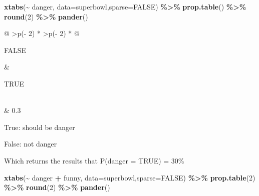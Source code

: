 \documentclass[
]{article}
\newenvironment{Shaded}{\begin{snugshade}}{\end{snugshade}}
\newcommand{\AttributeTok}[1]{\textcolor[rgb]{0.13,0.29,0.53}{#1}}
\newcommand{\ConstantTok}[1]{\textcolor[rgb]{0.56,0.35,0.01}{#1}}
\newcommand{\DecValTok}[1]{\textcolor[rgb]{0.00,0.00,0.81}{#1}}
\newcommand{\FunctionTok}[1]{\textcolor[rgb]{0.13,0.29,0.53}{\textbf{#1}}}
\newcommand{\NormalTok}[1]{#1}
\newcommand{\SpecialCharTok}[1]{\textcolor[rgb]{0.81,0.36,0.00}{\textbf{#1}}}
\begin{document}
\begin{Shaded}
\begin{Highlighting}[]
\FunctionTok{xtabs}\NormalTok{(}\SpecialCharTok{\textasciitilde{}}\NormalTok{ danger, }\AttributeTok{data=}\NormalTok{superbowl,}\AttributeTok{sparse=}\ConstantTok{FALSE}\NormalTok{) }\SpecialCharTok{\%\textgreater{}\%} \FunctionTok{prop.table}\NormalTok{() }\SpecialCharTok{\%\textgreater{}\%} \FunctionTok{round}\NormalTok{(}\DecValTok{2}\NormalTok{) }\SpecialCharTok{\%\textgreater{}\%} \FunctionTok{pander}\NormalTok{()}
\end{Highlighting}
\end{Shaded}

\begin{longtable}[]{@{}
  >{\centering\arraybackslash}p{(\columnwidth - 2\tabcolsep) * }
  >{\centering\arraybackslash}p{(\columnwidth - 2\tabcolsep) * }@{}}
\toprule\noalign{}
\begin{minipage}[b]{\linewidth}\centering
FALSE
\end{minipage} & \begin{minipage}[b]{\linewidth}\centering
TRUE
\end{minipage} \\
\midrule\noalign{}
\endhead
\bottomrule\noalign{}
 & 0.3 \\
\end{longtable}

True: should be danger

False: not danger

Which returns the results that P(danger = TRUE) = 30\%

\begin{Shaded}
\begin{Highlighting}[]
\FunctionTok{xtabs}\NormalTok{(}\SpecialCharTok{\textasciitilde{}}\NormalTok{ danger }\SpecialCharTok{+}\NormalTok{ funny, }\AttributeTok{data=}\NormalTok{superbowl,}\AttributeTok{sparse=}\ConstantTok{FALSE}\NormalTok{) }\SpecialCharTok{\%\textgreater{}\%} \FunctionTok{prop.table}\NormalTok{(}\DecValTok{2}\NormalTok{) }\SpecialCharTok{\%\textgreater{}\%} \FunctionTok{round}\NormalTok{(}\DecValTok{2}\NormalTok{) }\SpecialCharTok{\%\textgreater{}\%} \FunctionTok{pander}\NormalTok{()}
\end{Highlighting}
\end{Shaded}
\end{document}
